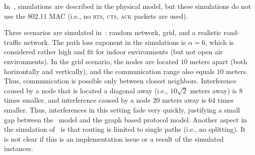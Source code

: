 \documentclass[12pt,oneside,english,a4paper]{book}
\theoremstyle{plain}
\theoremstyle{definition}
\theoremstyle{Theorem}
\theoremstyle{plain}
\newenvironment{proof sketch}[1]{\noindent {\emph{Proof sketch of #1:}}}{\hfill \qed}
\newcommand{\SINR}{\text{\sc{sinr}}}
\begin{document}
In~\cite{chafekarPhD}, simulations are described in the physical
model, but these simulations do not use the 802.11 MAC (i.e., no
\textsc{rts, cts, ack} packets are used).

Three scenarios are simulated in~\cite{chafekarPhD}: random network,
grid, and a realistic road-traffic network. The path loss exponent in
the simulations is $\alpha=6$, which is considered rather high and fit
for indoor environments (but not open air environments). In the grid
scenario, the nodes are located $10$ meters apart (both horizontally
and vertically), and the communication range also equals $10$ meters.
Thus, communication is possible only between closest neighbors.
Interference caused by a node that is located a diagonal away (i.e., $10\sqrt{2}$
meters away) is $8$ times smaller, and interference caused by a node
$20$ meters away is $64$ times smaller. Thus, interferences in this
setting fade very quickly, justifying a small gap between the \SINR\
model and the graph based protocol model. Another aspect in the
simulation of~\cite{chafekarPhD} is that routing is limited to single
paths (i.e., no splitting). It is not clear if this is an
implementation issue or a result of the simulated instances.
\end{document}
